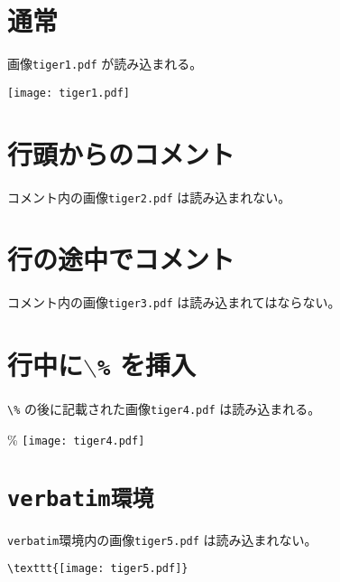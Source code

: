 \documentclass{jsarticle}
\begin{document}
\section{通常}
画像\texttt{tiger1.pdf} が読み込まれる。

\texttt{[image: tiger1.pdf]}

\section{行頭からのコメント}
コメント内の画像\texttt{tiger2.pdf} は読み込まれない。


\section{行の途中でコメント}
コメント内の画像\texttt{tiger3.pdf} は読み込まれてはならない。%

\section[行中に\%を挿入]{行中に\texttt{$\backslash$\%} を挿入}
\verb|\%| の後に記載された画像\texttt{tiger4.pdf} は読み込まれる。

\% \texttt{[image: tiger4.pdf]}

\section{\tt{verbatim}環境}
\texttt{verbatim}環境内の画像\texttt{tiger5.pdf} は読み込まれない。

\begin{verbatim}
\texttt{[image: tiger5.pdf]}
\end{verbatim}
\end{document}
